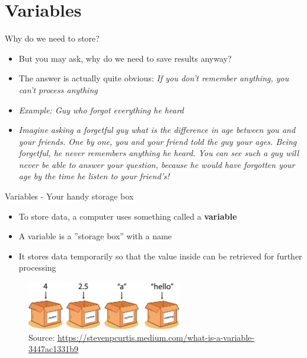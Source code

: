 \documentclass[10pt,xcolor={table,dvipsnames},t]{beamer}
\begin{document}
\section{Variables}
\begin{frame}{Why do we need to store?}
  \begin{itemize}
    \item But you may ask, why do we need to save results anyway?
    \item The answer is actually quite obvious: \textit{If you don't remember anything, you can't process anything}
    \item \textit{Example: Guy who forgot everything he heard}
    \item \textit{Imagine asking a forgetful guy what is the difference in age between you and your friends. One by one, you and your friend told the guy your ages. Being forgetful, he never remembers anything he heard. You can see such a guy will never be able to answer your question, because he would have forgotten your age by the time he listen to your friend's!}
  \end{itemize}
\end{frame}
\begin{frame}{Variables - Your handy storage box}
  \begin{itemize}
    \item To store data, a computer uses something called a \textbf{variable}
    \item A variable is a ”storage box” with a name
    \item It stores data temporarily so that the value inside can be retrieved for further processing
  \end{itemize}
  \begin{figure}
    \centering 
    \includegraphics[width=0.6\textwidth]{img/variable.png}
    \caption*{Source: \href{https://stevenpcurtis.medium.com/what-is-a-variable-3447ac1331b9}{https://stevenpcurtis.medium.com/what-is-a-variable-3447ac1331b9}}
  \end{figure}
\end{frame}
\end{document}
